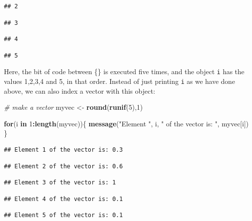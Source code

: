 \documentclass[]{book}
\newenvironment{Shaded}{\begin{snugshade}}{\end{snugshade}}
\newcommand{\CommentTok}[1]{\textcolor[rgb]{0.56,0.35,0.01}{\textit{#1}}}
\newcommand{\ControlFlowTok}[1]{\textcolor[rgb]{0.13,0.29,0.53}{\textbf{#1}}}
\newcommand{\DecValTok}[1]{\textcolor[rgb]{0.00,0.00,0.81}{#1}}
\newcommand{\KeywordTok}[1]{\textcolor[rgb]{0.13,0.29,0.53}{\textbf{#1}}}
\newcommand{\NormalTok}[1]{#1}
\newcommand{\OperatorTok}[1]{\textcolor[rgb]{0.81,0.36,0.00}{\textbf{#1}}}
\newcommand{\StringTok}[1]{\textcolor[rgb]{0.31,0.60,0.02}{#1}}
\begin{document}
\begin{verbatim}
## 2
\end{verbatim}

\begin{verbatim}
## 3
\end{verbatim}

\begin{verbatim}
## 4
\end{verbatim}

\begin{verbatim}
## 5
\end{verbatim}

Here, the bit of code between \{\} is executed five times, and the object \texttt{i} has the values 1,2,3,4 and 5, in that order. Instead of just printing \texttt{i} as we have done above, we can also index a vector with this object:

\begin{Shaded}
\begin{Highlighting}[]
\CommentTok{# make a vector}
\NormalTok{myvec <-}\StringTok{ }\KeywordTok{round}\NormalTok{(}\KeywordTok{runif}\NormalTok{(}\DecValTok{5}\NormalTok{),}\DecValTok{1}\NormalTok{)}

\ControlFlowTok{for}\NormalTok{(i }\ControlFlowTok{in} \DecValTok{1}\OperatorTok{:}\KeywordTok{length}\NormalTok{(myvec))\{}
  \KeywordTok{message}\NormalTok{(}\StringTok{"Element "}\NormalTok{, i, }\StringTok{" of the vector is: "}\NormalTok{, myvec[i])}
\NormalTok{\}}
\end{Highlighting}
\end{Shaded}

\begin{verbatim}
## Element 1 of the vector is: 0.3
\end{verbatim}

\begin{verbatim}
## Element 2 of the vector is: 0.6
\end{verbatim}

\begin{verbatim}
## Element 3 of the vector is: 1
\end{verbatim}

\begin{verbatim}
## Element 4 of the vector is: 0.1
\end{verbatim}

\begin{verbatim}
## Element 5 of the vector is: 0.1
\end{verbatim}
\end{document}
